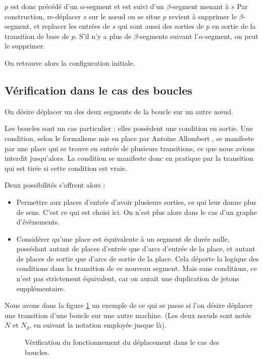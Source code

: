 $p$ est donc précédé d'un $\alpha$-segment et est suivi d'un $\beta$-segment menant à $s$
Par construction, re-déplacer $s$ sur le nœud ou se situe $p$ revient à supprimer le $\beta$-segment, et replacer les entrées de $s$ qui sont aussi des sorties de $p$ en sortie de la transition de base de $p$. S'il n'y a plus de $\beta$-segments suivant l'$\alpha$-segment, on peut le supprimer.

On retrouve alors la configuration initiale.

\subsection{Vérification dans le cas des boucles}
On désire déplacer un des deux segments de la boucle sur un autre nœud.

Les boucles sont un cas particulier : elles possèdent une condition en sortie.
Une condition, selon le formalisme mis en place par Antoine Allombert \cite[p. 167--170]{allombert2009aspects}, se manifeste par une place qui se trouve en entrée de plusieurs transitions, ce que nous avions interdit jusqu'alors. La condition se manifeste donc en pratique par la transition qui est tirée si cette condition est vraie.

Deux possibilités s'offrent alors : 
\begin{itemize}
\item Permettre aux places d'entrée d'avoir plusieurs sorties, ce qui leur donne plus de sens. C'est ce qui est choisi ici. On n'est plus alors dans le cas d'un graphe d'évènements.
\item Considérer qu'une place est équivalente à un segment de durée nulle, possédant autant de places d'entrée que d'arcs d'entrée de la place, et autant de places de sortie que d'arcs de sortie de la place. Cela déporte la logique des conditions dans la transition de ce nouveau segment. Mais sans conditions, ce n'est pas strictement équivalent, car on aurait une duplication de jetons supplémentaire.
\end{itemize}

Nous avons dans la figure \ref{fig:verifBoucles} un exemple de ce qui se passe si l'on désire déplacer une transition d'une boucle sur une autre machine. (Les deux nœuds sont notés $N$ et $N_d$, en suivant la notation employée jusque là).

\begin{figure}[H]
\centering

\caption{Vérification du fonctionnement du déplacement dans le cas des boucles.}
\label{fig:verifBoucles}
\end{figure}


